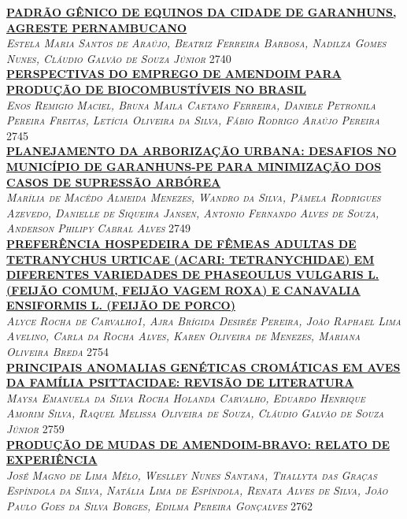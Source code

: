 \noindent \textsc{\hyperlink{trabalhos/251606.pdf.1}{\textbf{PADRÃO GÊNICO DE EQUINOS DA CIDADE DE GARANHUNS, AGRESTE PERNAMBUCANO}}}\\ 
\noindent \textsc{\textit{Estela Maria Santos de Araújo, Beatriz Ferreira Barbosa, Nadilza Gomes Nunes, Cláudio Galvão de Souza Júnior}} \hfill 2740\\ 

\noindent \textsc{\hyperlink{trabalhos/251603.pdf.1}{\textbf{PERSPECTIVAS DO EMPREGO DE AMENDOIM PARA PRODUÇÃO DE BIOCOMBUSTÍVEIS NO BRASIL}}}\\ 
\noindent \textsc{\textit{Enos Remigio Maciel, Bruna Maila Caetano Ferreira, Daniele Petronila Pereira Freitas, Letícia Oliveira da Silva, Fábio Rodrigo Araújo Pereira}} \hfill 2745\\ 

\noindent \textsc{\hyperlink{trabalhos/249770.pdf.1}{\textbf{PLANEJAMENTO DA ARBORIZAÇÃO URBANA: DESAFIOS NO MUNICÍPIO DE GARANHUNS-PE PARA MINIMIZAÇÃO DOS CASOS DE SUPRESSÃO ARBÓREA}}}\\ 
\noindent \textsc{\textit{Marília de Macêdo Almeida Menezes, Wandro da Silva, Pâmela Rodrigues Azevedo, Danielle de Siqueira Jansen, Antonio Fernando Alves de Souza, Anderson Philipy Cabral Alves}} \hfill 2749\\ 

\noindent \textsc{\hyperlink{trabalhos/251477.pdf.1}{\textbf{PREFERÊNCIA HOSPEDEIRA DE FÊMEAS ADULTAS DE TETRANYCHUS URTICAE (ACARI: TETRANYCHIDAE) EM DIFERENTES VARIEDADES DE PHASEOULUS VULGARIS L. (FEIJÃO COMUM, FEIJÃO VAGEM ROXA) E CANAVALIA ENSIFORMIS L. (FEIJÃO DE PORCO)}}}\\ 
\noindent \textsc{\textit{Alyce Rocha de Carvalho1, Ajra Brígida Desirée Pereira, João Raphael Lima Avelino, Carla da Rocha Alves, Karen Oliveira de Menezes, Mariana Oliveira Breda}} \hfill 2754\\ 

\noindent \textsc{\hyperlink{trabalhos/249389.pdf.1}{\textbf{PRINCIPAIS ANOMALIAS GENÉTICAS CROMÁTICAS EM AVES DA FAMÍLIA PSITTACIDAE: REVISÃO DE LITERATURA}}}\\ 
\noindent \textsc{\textit{Maysa Emanuela da Silva Rocha Holanda Carvalho, Eduardo Henrique Amorim Silva, Raquel Melissa Oliveira de Souza, Cláudio Galvão de Souza Júnior}} \hfill 2759\\ 

\noindent \textsc{\hyperlink{trabalhos/250324.pdf.1}{\textbf{PRODUÇÃO DE MUDAS DE AMENDOIM-BRAVO: RELATO DE EXPERIÊNCIA}}}\\ 
\noindent \textsc{\textit{José Magno de Lima Mélo, Weslley Nunes Santana, Thallyta das Graças Espíndola da Silva, Natália Lima de Espíndola, Renata Alves de Silva, João Paulo Goes da Silva Borges, Edilma Pereira Gonçalves}} \hfill 2762\\ 

